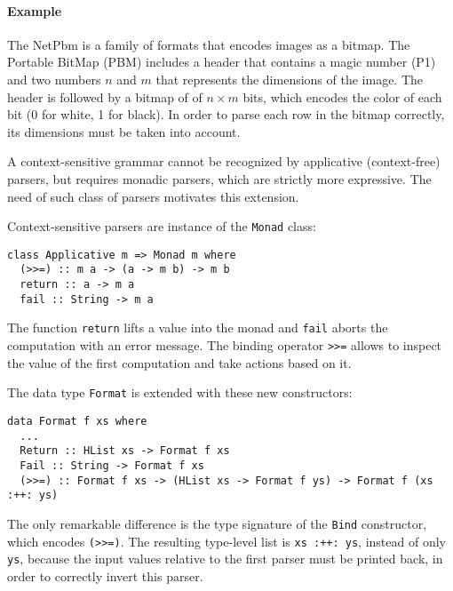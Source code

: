 \documentclass[../Thesis.tex]{subfiles}
\begin{document}
\paragraph{Example}
The NetPbm is a family of formats that encodes images as a bitmap. 
The Portable BitMap (PBM) includes a header that contains a magic number (P1) and two numbers $n$ and $m$ that represents the dimensions of the image. The header is followed by a bitmap of of $n \times m$ bits, which encodes the color of each bit (0 for white, 1 for black). In order to parse each row in the bitmap correctly, its dimensions must be taken into account.

A context-sensitive grammar cannot be recognized by applicative (context-free) parsers, but requires monadic parsers, which are 
strictly more expressive. The need of such class of parsers motivates this extension.

Context-sensitive parsers are instance of the \texttt{Monad} class:

\begin{verbatim}
class Applicative m => Monad m where
  (>>=) :: m a -> (a -> m b) -> m b
  return :: a -> m a
  fail :: String -> m a
\end{verbatim}

The function \texttt{return} lifts a value into the monad and \texttt{fail}
aborts the computation with an error message.
The binding operator \texttt{>>=} allows to inspect the value of the first computation and take actions based on it.

The data type \texttt{Format} is extended with these new constructors:

\begin{verbatim}
data Format f xs where
  ...
  Return :: HList xs -> Format f xs
  Fail :: String -> Format f xs
  (>>=) :: Format f xs -> (HList xs -> Format f ys) -> Format f (xs :++: ys)
\end{verbatim}

The only remarkable difference is the type signature of the \texttt{Bind} constructor, which encodes \texttt{(>>=)}. 
The resulting type-level list is \texttt{xs :++: ys},
instead of only \texttt{ys}, because the input values relative to the first parser 
must be printed back, in order to correctly invert this parser.

%
\end{document}
